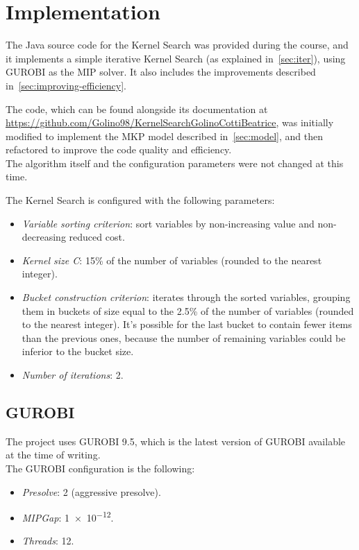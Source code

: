 \chapter{Implementation}\label{ch:implementation}
The Java source code for the Kernel Search was provided during the course,
and it implements a simple iterative Kernel Search (as explained in~\ref{sec:iter}),
using GUROBI as the MIP solver.
It also includes the improvements described in~\ref{sec:improving-efficiency}.

The code, which can be found alongside its documentation at
\url{https://github.com/Golino98/KernelSearchGolinoCottiBeatrice},
was initially modified to implement the MKP model described in~\ref{sec:model},
and then refactored to improve the code quality and efficiency.\\
The algorithm itself and the configuration parameters were not changed at this time.

The Kernel Search is configured with the following parameters:
\begin{itemize}
    \item \textit{Variable sorting criterion}: sort variables by non-increasing value and non-decreasing reduced cost.
    \item \textit{Kernel size C}: 15\% of the number of variables (rounded to the nearest integer).
    \item \textit{Bucket construction criterion}: iterates through the sorted variables, grouping them in
    buckets of size equal to the 2.5\% of the number of variables (rounded to the nearest integer).
    It's possible for the last bucket to contain fewer items than the previous ones, because the number
    of remaining variables could be inferior to the bucket size.
    \item \textit{Number of iterations}: 2.
\end{itemize}


\section{GUROBI}
The project uses GUROBI 9.5, which is the latest version of GUROBI available at the time of writing.\\
The GUROBI configuration is the following:
\begin{itemize}
    \item \textit{Presolve}: 2 (aggressive presolve).
    \item \textit{MIPGap}: \num{1e-12}.
    \item \textit{Threads}: 12.
\end{itemize}
